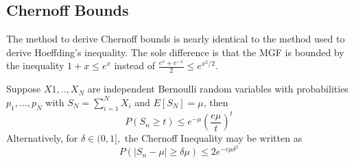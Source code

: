 
\subsection{Chernoff Bounds}
The method to derive Chernoff bounds is nearly identical to the method used to derive Hoeffding's inequality. The sole difference is that the MGF is bounded by the inequality $1+x \leq e^x$ instead of $\frac{e^x + e^{-x}}{2} \leq e^{x^2/2}.$ \\ 

\begin{tcolorbox}
\begin{theorem}
Suppose $X1, .., X_N$ are independent Bernoulli random variables with probabilities $p_1, ..., p_N$ with $S_N = \sum_{i=1}^{N}X_i$ and $E[S_N] = \mu$, then
    \begin{equation}
    P(S_n \geq t) \leq e^{-\mu}\left(\frac{e \mu}{t}\right)^t
    \label{eq:chernoff1}
    \end{equation}
Alternatively, for $\delta \in (0,1],$ the Chernoff Inequality may be written as 
    \begin{equation}
    P\left(|S_n-\mu| \geq \delta \mu \right) \leq 2e^{-c \mu \delta^2}
    \label{eq:chernoff2}
    \end{equation}
\label{theorem:chernoff}
\end{theorem}
\end{tcolorbox}


